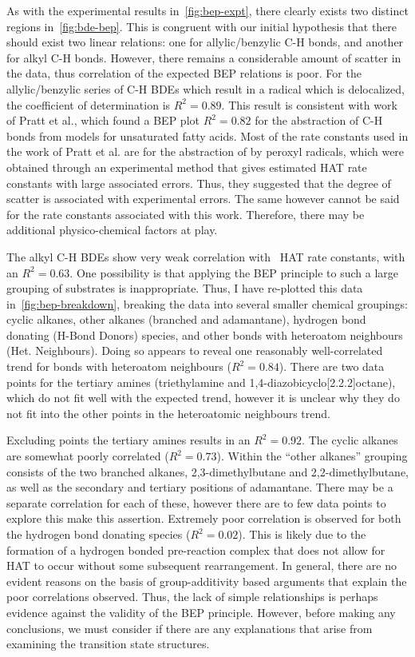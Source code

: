 As with the experimental results in~\ref{fig:bep-expt}, there clearly exists
two distinct regions in~\ref{fig:bde-bep}. This is congruent with our initial
hypothesis that there should exist two linear relations: one for
allylic/benzylic C-H bonds, and another for alkyl C-H bonds. However, there
remains a considerable amount of scatter in the data, thus correlation of the
expected BEP relations is poor. For the allylic/benzylic series of C-H BDEs
which result in a radical which is delocalized, the coefficient of
determination is $R^2 = 0.89$. This result is consistent with work of Pratt et
al.\cite{Pratt2003}, which found a BEP plot $R^2 =0.82$ for the abstraction of
C-H bonds from models for unsaturated fatty acids. Most of the rate constants
used in the work of Pratt et al. are for the abstraction of  by peroxyl
radicals, which were obtained through an experimental method that gives
estimated HAT rate constants with large associated errors. Thus, they suggested
that the degree of scatter is associated with experimental errors. The same
however cannot be said for the rate constants associated with this work.
Therefore, there may be additional physico-chemical factors at play.

The alkyl C-H BDEs show very weak correlation with \cumo\ HAT rate constants,
with an $R^2 =0.63$. One possibility is that applying the BEP principle to such
a large grouping of substrates is inappropriate. Thus, I have re-plotted this
data in~\ref{fig:bep-breakdown}, breaking the data into several smaller
chemical groupings: cyclic alkanes, other alkanes (branched and adamantane),
hydrogen bond donating (H-Bond Donors) species, and other  bonds with
heteroatom neighbours (Het. Neighbours). Doing so appears to reveal one
reasonably well-correlated trend for  bonds with heteroatom neighbours
($R^2 = 0.84$). There are two data points for the tertiary amines
(triethylamine and 1,4-diazobicyclo[2.2.2]octane),
which do not fit well with the expected trend, however it is unclear why they
do not fit into the other points in the heteroatomic neighbours trend.

Excluding points the tertiary amines results in an $R^2 = 0.92$.  The cyclic
alkanes are somewhat poorly correlated ($R^2 = 0.73$). Within the ``other
alkanes'' grouping consists of the two branched alkanes, 2,3-dimethylbutane and
2,2-dimethylbutane, as well as the secondary and tertiary  positions of
adamantane. There may be a separate correlation for each of these, however
there are to few data points to explore this make this assertion. Extremely
poor correlation is observed for both the hydrogen bond donating species ($R^2
= 0.02$). This is likely due to the formation of a hydrogen bonded pre-reaction
complex that does not allow for HAT to occur without some subsequent
rearrangement. In general, there are no evident reasons on the basis of
group-additivity based arguments that explain the poor correlations observed.
Thus, the lack of simple relationships is perhaps evidence against the validity
of the BEP principle. However, before making any conclusions, we must consider
if there are any explanations that arise from examining the transition state
structures.


